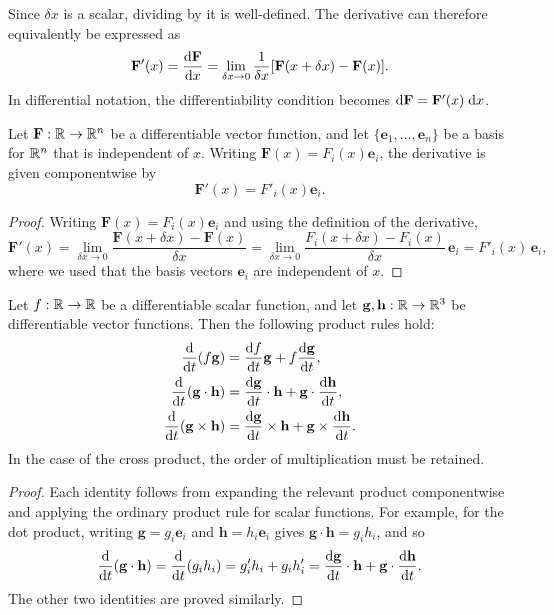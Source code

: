 \documentclass[a4paper]{article}
\begin{document}
\begin{rmk}
  Since $\delta x$ is a scalar, dividing by it is well-defined. The derivative can therefore equivalently be expressed as
  \[
    \mathbf{F}'(x) = \frac{\mathrm{d} \mathbf{F}}{\mathrm{d} x} = \lim_{\delta x \to 0} \frac{1}{\delta x}[\mathbf{F}(x + \delta x) - \mathbf{F}(x)].
  \]
  In differential notation, the differentiability condition becomes $\mathrm{d}\mathbf{F} = \mathbf{F}'(x)\;\mathrm{d} x$.
\end{rmk}

\begin{prop}
  Let $\mathbf{F}: \mathbb{R} \to \mathbb{R}^n$ be a differentiable vector function, and let $\{\mathbf{e}_1, \ldots, \mathbf{e}_n\}$ be a basis for $\mathbb{R}^n$ that is independent of $x$. Writing $\mathbf{F}(x) = F_i(x)\mathbf{e}_i$, the derivative is given componentwise by
  \[
    \mathbf{F}'(x) = F'_i(x)\mathbf{e}_i.
  \]
\end{prop}

\begin{proof}
  Writing $\mathbf{F}(x) = F_i(x)\mathbf{e}_i$ and using the definition of the derivative,
  \[
    \mathbf{F}'(x) = \lim_{\delta x \to 0} \frac{\mathbf{F}(x + \delta x) - \mathbf{F}(x)}{\delta x} = \lim_{\delta x \to 0} \frac{F_i(x + \delta x) - F_i(x)}{\delta x}\,\mathbf{e}_i = F'_i(x)\,\mathbf{e}_i,
  \]
  where we used that the basis vectors $\mathbf{e}_i$ are independent of $x$.
\end{proof}

\begin{prop}
  Let $f: \mathbb{R} \to \mathbb{R}$ be a differentiable scalar function, and let $\mathbf{g}, \mathbf{h}: \mathbb{R} \to \mathbb{R}^3$ be differentiable vector functions. Then the following product rules hold:
  \begin{align*}
    \frac{\mathrm{d}}{\mathrm{d} t}(f\mathbf{g}) &= \frac{\mathrm{d} f}{\mathrm{d} t}\mathbf{g} + f\frac{\mathrm{d} \mathbf{g}}{\mathrm{d} t},\\
    \frac{\mathrm{d}}{\mathrm{d} t}(\mathbf{g}\cdot \mathbf{h}) &= \frac{\mathrm{d} \mathbf{g}}{\mathrm{d} t}\cdot \mathbf{h} + \mathbf{g}\cdot \frac{\mathrm{d} \mathbf{h}}{\mathrm{d} t},\\
    \frac{\mathrm{d}}{\mathrm{d} t}(\mathbf{g}\times \mathbf{h}) &= \frac{\mathrm{d} \mathbf{g}}{\mathrm{d} t}\times \mathbf{h} + \mathbf{g}\times \frac{\mathrm{d} \mathbf{h}}{\mathrm{d} t}.
  \end{align*}
  In the case of the cross product, the order of multiplication must be retained.
\end{prop}

\begin{proof}
  Each identity follows from expanding the relevant product componentwise and applying the ordinary product rule for scalar functions. For example, for the dot product, writing $\mathbf{g} = g_i \mathbf{e}_i$ and $\mathbf{h} = h_i \mathbf{e}_i$ gives $\mathbf{g}\cdot \mathbf{h} = g_i h_i$, and so
  \[
    \frac{\mathrm{d}}{\mathrm{d} t}(\mathbf{g}\cdot \mathbf{h}) = \frac{\mathrm{d}}{\mathrm{d} t}(g_i h_i) = g'_i h_i + g_i h'_i = \frac{\mathrm{d} \mathbf{g}}{\mathrm{d} t}\cdot \mathbf{h} + \mathbf{g}\cdot \frac{\mathrm{d} \mathbf{h}}{\mathrm{d} t}.
  \]
  The other two identities are proved similarly.
\end{proof}
\end{document}
